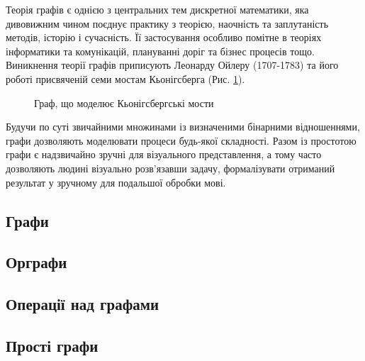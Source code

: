 Теорія графів є однією з центральних тем дискретної математики, яка дивовижним чином поєднує практику з теорією, наочність та заплутаність методів, історію і сучасність.
Її застосування особливо помітне в теоріях інформатики та комунікацій, плануванні доріг та бізнес процесів тощо.
Виникнення теорії графів приписують Леонарду Ойлеру (1707-1783) та його роботі присвяченій семи мостам Кьонігсберга (Рис. \ref{koenigsberg_graph}).
\begin{figure}[h]
        \centering
                
        \caption{Граф, що моделює Кьонігсбергські мости}
        \label{koenigsberg_graph}
\end{figure}
Будучи по суті звичайними множинами із визначеними бінарними відношеннями, графи дозволяють моделювати процеси будь-якої складності.
Разом із простотою графи є надзвичайно зручні для візуального представлення, а тому часто дозволяють людині візуально розв'язавши задачу, формалізувати отриманий результат у зручному для подальшої обробки мові.

\newpage
\subsection{Графи}


\newpage
\subsection{Орграфи}


\newpage
\subsection{Операції над графами}


\newpage
\subsection{Прості графи}

